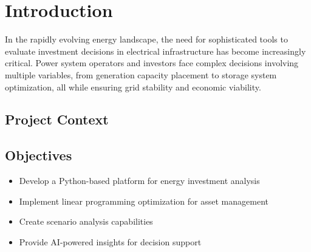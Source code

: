 \newpage
\section{Introduction}
In the rapidly evolving energy landscape, the need for sophisticated tools to evaluate
investment decisions in electrical infrastructure has become increasingly critical.
Power system operators and investors face complex decisions involving multiple variables,
from generation capacity placement to storage system optimization, all while ensuring grid
stability and economic viability.

\subsection{Project Context}

\subsection{Objectives}
\begin{itemize}
    \item Develop a Python-based platform for energy investment analysis
    \item Implement linear programming optimization for asset management
    \item Create scenario analysis capabilities
    \item Provide AI-powered insights for decision support
\end{itemize}
\newpage 


